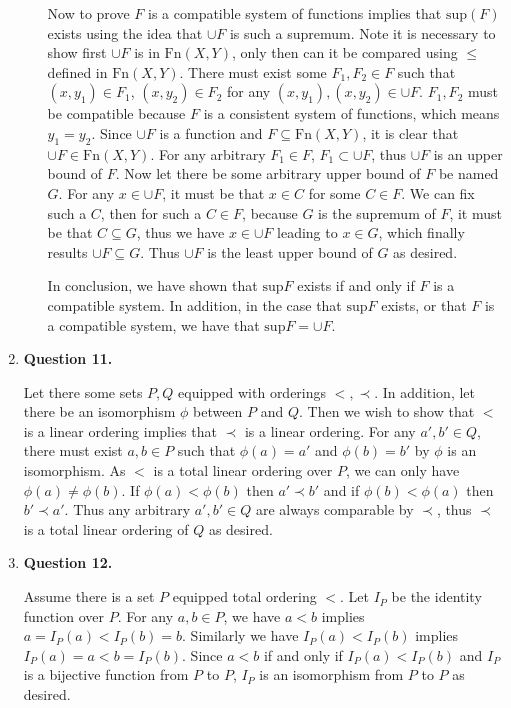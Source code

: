 \documentclass{article}
\begin{document}
\begin{enumerate}
\begin{enumerate}
	 Now to prove $F$ is a compatible system of functions implies that $\text{sup} (F)$ exists using the idea that $\cup F$ is such a supremum. Note it is necessary to show first $\cup F$ is in $\text{Fn}(X,Y)$, only then can it be compared using $\leq$ defined in $\text{Fn}(X,Y)$. There must exist some $F_1,F_2 \in F$ such that $(x, y_1) \in F_1$, $(x, y_2) \in F_2$ for any $(x, y_1), (x, y_2) \in \cup F$. $F_1,F_2$ must be compatible because $F$ is a consistent system of functions, which means $y_1 = y_2$. Since $\cup F$ is a function and $F \subseteq \text{Fn}(X,Y)$, it is clear that $\cup F \in \text{Fn}(X,Y)$. For any arbitrary $F_1 \in F$, $F_1 \subset \cup F$, thus $\cup F$ is an upper bound of $F$.  Now let there be some arbitrary upper bound of $F$ be named $G$. For any $x \in \cup F$, it must be that $x \in C$ for some $C \in F$. We can fix such a $C$, then for such a $C \in F$, because $G$ is the supremum of $F$, it must be that $C \subseteq G$, thus we have $x \in \cup F$ leading to $x \in G$, which finally results $\cup F \subseteq G$. Thus $\cup F$ is the least upper bound of $G$ as desired.
	 
	 \medskip
	 
	 In conclusion, we have shown that $\text{sup} F$ exists if and only if $F$ is a compatible system. In addition, in the case that $\text{sup} F$ exists, or that $F$ is a compatible system, we have that $\text{sup} F = \cup F$.
	 	 
\end{enumerate}
	 
	 \item \textbf{Question 11.}
	 \medskip
	 
	 Let there some sets $P,Q$ equipped with orderings $<, \prec$. In addition, let there be an isomorphism $\phi$ between $P$ and $Q$. Then we wish to show that $<$ is a linear ordering implies that $\prec$ is a linear ordering. For any $a',b' \in Q$, there must exist $a,b \in P$ such that $\phi(a)  = a'$ and $\phi(b) = b'$ by $\phi$ is an isomorphism. As $<$ is a total linear ordering over $P$,  we can only have $\phi(a) \neq \phi(b)$. If $\phi(a) < \phi(b)$ then $a' \prec b'$ and if $\phi(b) < \phi(a)$ then $b' \prec a'$. Thus any arbitrary $a',b' \in Q$ are always comparable by $\prec$, thus $\prec$ is a total linear ordering of $Q$ as desired.
	 
	 \item \textbf{Question 12.}
	 \medskip
	 
	 Assume there is a set $P$ equipped total ordering $<$. Let $I_{P}$ be the identity function over $P$.
	 For any $a,b \in P$, we have $a < b$ implies $a = I_{P}(a) < I_{P}(b) = b$. Similarly we have $I_{P}(a) < I_{P}(b)$ implies $I_{P}(a) = a < b = I_{P}(b)$. Since $a < b$ if and only if $I_{P}(a) < I_{P}(b)$ and $I_{P}$ is a bijective function from $P$ to $P$, $I_{P}$ is an isomorphism from $P$ to $P$ as desired.
	 

\end{enumerate}
\end{document}
